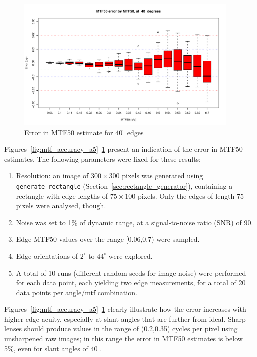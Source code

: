 \documentclass[a4paper]{article}
\begin{document}
\begin{figure}
\centering
\includegraphics[width=0.95\textwidth]{figures/accuracy_plot_a40}
\caption{Error in MTF50 estimate for $40^\circ$ edges}
\label{fig:mtf_accuracy_a40}
\end{figure}


Figures~\ref{fig:mtf_accuracy_a5}--\ref{fig:mtf_accuracy_a40} present an indication of the error in MTF50
estimates. The following parameters were fixed for these results:
\begin{enumerate}
  \item Resolution: an image of $300\times300$ pixels was generated using
\texttt{generate\_rectangle} (Section~\ref{sec:rectangle_generator}), 
containing a rectangle with edge lengths of $75\times100$ pixels. Only the
edges of length $75$ pixels were analysed, though.
  \item Noise was set to 1\% of dynamic range, at a signal-to-noise ratio
(SNR) of 90.
  \item Edge MTF50 values over the range [0.06,0.7) were sampled.
  \item Edge orientations of $2^\circ$ to $44^\circ$ were
explored.
  \item A total of 10 runs (different random seeds for image noise) were
performed for each data point, each yielding two edge measurements, for a
total of 20 data points per angle/mtf combination.
\end{enumerate}
Figures~\ref{fig:mtf_accuracy_a5}--\ref{fig:mtf_accuracy_a40}
clearly illustrate how the error increases
with higher edge acuity, especially at slant angles that are further from
ideal. Sharp lenses should produce values in the range of (0.2,0.35) cycles
per pixel using unsharpened raw images; in this range the error in
MTF50 estimates is below 5\%, even for slant angles of $40^\circ$.
\end{document}
